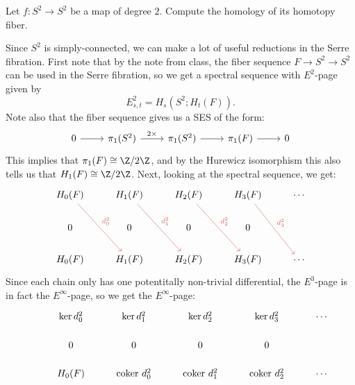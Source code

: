 \documentclass[11pt,letterpaper]{article}
\begin{document}
\begin{problem}%
    Let $f : S^2 \to S^2$ be a map of degree $2$. Compute the homology of its homotopy fiber.
\end{problem}

\begin{solution}
    Since $S^2$ is simply-connected, we can make a lot of useful reductions in the Serre fibration. First note that by the note from class, the fiber sequence $F \to S^2 \to S^2$ can be used in the Serre fibration, so we get a spectral sequence with $E^2$-page given by
    \[
        E^2_{s,t} = H_s(S^2; H_t(F))
    .\]
    Note also that the fiber sequence gives us a SES of the form:
    \[\begin{tikzcd}
        0 & {\pi_1(S^2)} & {\pi_1(S^2)} & {\pi_1(F)} & 0
        \arrow[from=1-1, to=1-2]
        \arrow["2\times", from=1-2, to=1-3]
        \arrow[from=1-3, to=1-4]
        \arrow[from=1-4, to=1-5]
    \end{tikzcd}\]
    This implies that $\pi_1(F)\cong \Z /2\Z$, and by the Hurewicz isomorphism this also tells us that $H_1(F)\cong \Z /2\Z$. Next, looking at the spectral sequence, we get:
    \[\begin{tikzcd}
        {H_0(F)} & {H_1(F)} & {H_2(F)} & {H_3(F)} & \cdots \\
        0 & 0 & 0 & 0 \\
        {H_0(F)} & {H_1(F)} & {H_2(F)} & {H_3(F)} & \cdots
        \arrow["{d^2_0}", color={rgb,255:red,214;green,92;blue,92}, from=1-1, to=3-2]
        \arrow["{d^2_1}", color={rgb,255:red,214;green,92;blue,92}, from=1-2, to=3-3]
        \arrow["{d^2_2}", color={rgb,255:red,214;green,92;blue,92}, from=1-3, to=3-4]
        \arrow["{d^2_3}", color={rgb,255:red,214;green,92;blue,92}, from=1-4, to=3-5]
    \end{tikzcd}\]
    Since each chain only has one potentitally non-trivial differential, the $E^3$-page is in fact the $E^\infty$-page, so we get the $E^\infty$-page:
    \[\begin{tikzcd}[row sep=scriptsize]
        & {\ker d^2_0} & {\ker d_1^2} & {\ker d^2_2} & {\ker d^2_3} & \cdots \\
        & 0 & 0 & 0 & 0 \\
        & {H_0(F)} & {\textrm{coker }d^2_0} & {\textrm{coker }d^2_1} & {\textrm{coker }d^2_2} & \cdots \\

\end{tikzcd}\]
\end{solution}
\end{document}
